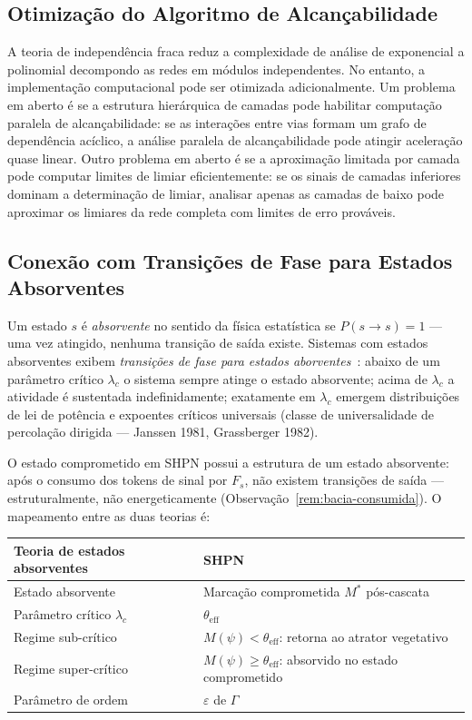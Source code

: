 \subsection{Otimização do Algoritmo de Alcançabilidade}

A teoria de independência fraca reduz a complexidade de análise de exponencial a
polinomial decompondo as redes em módulos independentes.
No entanto, a implementação computacional pode ser otimizada adicionalmente.
Um problema em aberto é se a estrutura hierárquica de camadas pode habilitar
computação paralela de alcançabilidade: se as interações entre vias formam um
grafo de dependência acíclico, a análise paralela de alcançabilidade pode
atingir aceleração quase linear.
Outro problema em aberto é se a aproximação limitada por camada pode computar
limites de limiar eficientemente: se os sinais de camadas inferiores dominam a
determinação de limiar, analisar apenas as camadas de baixo pode aproximar os
limiares da rede completa com limites de erro prováveis.

\subsection{Conexão com Transições de Fase para Estados Absorventes}
\label{subsec:estados-absorventes}

Um estado $s$ é \emph{absorvente} no sentido da física estatística se
$P(s \to s) = 1$ --- uma vez atingido, nenhuma transição de saída existe.
Sistemas com estados absorventes exibem \emph{transições de fase para estados
aborventes}~\parencite{Hinrichsen2000}: abaixo de um parâmetro crítico
$\lambda_c$ o sistema sempre atinge o estado absorvente; acima de $\lambda_c$
a atividade é sustentada indefinidamente; exatamente em $\lambda_c$ emergem
distribuições de lei de potência e expoentes críticos universais (classe de
universalidade de percolação dirigida --- Janssen 1981, Grassberger 1982).

O estado comprometido em SHPN possui a estrutura de um estado absorvente: após
o consumo dos tokens de sinal por $F_s$, não existem transições de saída ---
estruturalmente, não energeticamente (Observação~\ref{rem:bacia-consumida}).
O mapeamento entre as duas teorias é:

\begin{center}\small
\begin{tabular}{@{}ll@{}}
\toprule
Teoria de estados absorventes & SHPN \\
\midrule
Estado absorvente & Marcação comprometida $M^*$ pós-cascata \\
Parâmetro crítico $\lambda_c$ & $\theta_\text{eff}$ \\
Regime sub-crítico & $M(\psi) < \theta_\text{eff}$: retorna ao atrator vegetativo \\
Regime super-crítico & $M(\psi) \geq \theta_\text{eff}$: absorvido no estado comprometido \\
Parâmetro de ordem & $\varepsilon$ de $\Gamma$ \\
\bottomrule
\end{tabular}
\end{center}

